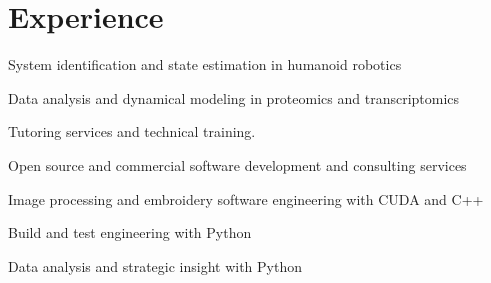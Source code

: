 \documentclass[letterpaper]{deedy-resume} %
\begin{document}
\begin{minipage}[t]{0.66\textwidth} %


\section{Experience}


\vspace{\topsep}
\begin{tightitemize}
\item System identification and state estimation in humanoid robotics
\item Data analysis and dynamical modeling in proteomics and transcriptomics
\item Tutoring services and technical training.
\item Open source and commercial software development and consulting services
\end{tightitemize}


\sectionspace


\begin{tightitemize}
\item Image processing and embroidery software engineering with CUDA and C++
\item Build and test engineering with Python
\item Data analysis and strategic insight with Python

\end{tightitemize}





\sectionspace %


\end{minipage}
\end{document}
